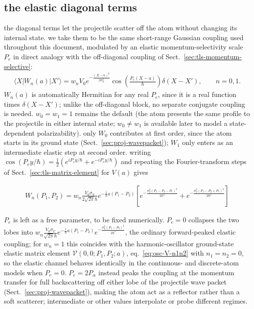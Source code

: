\subsection{the elastic diagonal terms}\label{sec:tls-elastic}
the diagonal terms let the projectile scatter off the atom without changing its internal state. we take them to be the same short-range Gaussian coupling used throughout this document, modulated by an elastic momentum-selectivity scale $P_e$ in direct analogy with the off-diagonal coupling of Sect.~\ref{sec:tls-momentum-selective}:
\begin{align}
    \langle X|W_n(a)|X'\rangle = w_n V_0 e^{-\frac{(X-a)^2}{2\sigma_V^2}}\cos\!\left(\frac{P_e(X-a)}{\hbar}\right)\delta(X-X'),\qquad n=0,1.
\end{align}
$W_n(a)$ is automatically Hermitian for any real $P_e$, since it is a real function times $\delta(X-X')$; unlike the off-diagonal block, no separate conjugate coupling is needed. $w_0=w_1=1$ remains the default (the atom presents the same profile to the projectile in either internal state; $w_0\ne w_1$ is available later to model a state-dependent polarizability). only $W_0$ contributes at first order, since the atom starts in its ground state (Sect.~\ref{sec:proj-wavepacket}); $W_1$ only enters as an intermediate elastic step at second order. writing $\cos(P_e y/\hbar)=\frac12(e^{iP_ey/\hbar}+e^{-iP_ey/\hbar})$ and repeating the Fourier-transform steps of Sect.~\ref{sec:tls-matrix-element} for $V(a)$ gives
\begin{importantbox}
    \begin{align}
        W_n(P_1,P_2) = w_n\frac{V_0\sigma_V}{2\sqrt{2\pi}\hbar}e^{-\frac{i}{\hbar}a(P_1-P_2)}\left[e^{-\frac{\sigma_V^2(P_1-P_2-P_e)^2}{2\hbar^2}}+e^{-\frac{\sigma_V^2(P_1-P_2+P_e)^2}{2\hbar^2}}\right]\label{eq:tls-Wn}
    \end{align}
\end{importantbox}
$P_e$ is left as a free parameter, to be fixed numerically. $P_e=0$ collapses the two lobes into $w_n\frac{V_0\sigma_V}{\sqrt{2\pi}\hbar}e^{-\frac{i}{\hbar}a(P_1-P_2)}e^{-\frac{\sigma_V^2(P_1-P_2)^2}{2\hbar^2}}$, the ordinary forward-peaked elastic coupling; for $w_n=1$ this coincides with the harmonic-oscillator ground-state elastic matrix element $\mathcal V(0,0;P_1,P_2;a)$, eq.~\eqref{eq:osc-V-n1n2} with $n_1=n_2=0$, so the elastic channel behaves identically in the continuous- and discrete-atom models when $P_e=0$. $P_e=2P_\alpha$ instead peaks the coupling at the momentum transfer for full backscattering off either lobe of the projectile wave packet (Sect.~\ref{sec:proj-wavepacket}), making the atom act as a reflector rather than a soft scatterer; intermediate or other values interpolate or probe different regimes.

